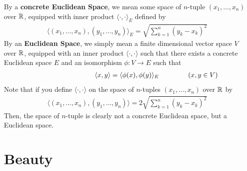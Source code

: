 \documentclass{report}
\begin{document}
\begin{mdframed}
  By a \textbf{concrete Euclidean Space}, we mean some space of $n$-tuple  $(x_1,\dots ,x_n)$ over $\mathbb{R}$, equipped with inner product  $\langle \cdot,\cdot\rangle_E$ defined by 
\begin{align*}
  \langle  (x_1,\dots,x_n)  ,(y_1,\dots ,y_n)\rangle_E= \sqrt{\sum_{k=1}^n (y_k-x_k)^2} 
\end{align*}
By an \textbf{Euclidean Space}, we simply mean a finite dimensional vector space $V$ over $\mathbb{R}$,  equipped with an inner product $\langle \cdot,\cdot\rangle $ such that there exists a concrete Euclidean space $E$ and an isomorphism  $\phi:V\to E$ such that 
\begin{align*}
\hspace{3cm}\langle x,y\rangle= \langle \phi (x),\phi (y)\rangle_E \hspace{1.5cm}(x,y \in V)
\end{align*}
Note that if you define $\langle \cdot,\cdot\rangle $ on the space of $n$-tuples $(x_1,\dots ,x_n)$ over $\mathbb{R}$ by 
\begin{align*}
  \langle  (x_1,\dots,x_n)  ,(y_1,\dots ,y_n)\rangle=2 \sqrt{\sum_{k=1}^n (y_k-x_k)^2} 
\end{align*}
Then, the space of $n$-tuple is clearly not a concrete Euclidean space, but a Euclidean space. 

\end{mdframed}

\chapter{Beauty}
\end{document}
